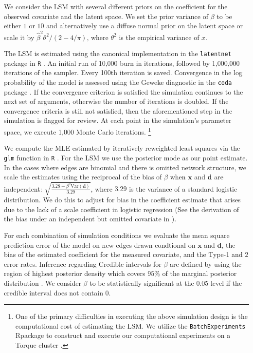 \documentclass[11pt]{article}
\newcommand{\R}{\textsf{R}\space} %
\begin{document}
We consider the LSM with several different priors on the coefficient for the observed covariate and the latent space. We set the prior variance of $\beta$ to be either $1$ or $10$ and alternatively use a diffuse normal prior on the latent space or scale it by $\hat{\beta}^2\theta^2/(2-4/\pi)$, where $\theta^2$ is the empirical variance of $x$.

The LSM is estimated using the canonical implementation in the \texttt{latentnet} package in \texttt{R} \citep{latentnet}. An initial run of 10,000 burn in iterations, followed by 1,000,000 iterations of the sampler. Every 100th iteration is saved. Convergence in the log probability of the model is assessed using the Geweke diagnostic in the \texttt{coda} package \citep{coda, geweke1991evaluating}. If the convergence criterion is satisfied the simulation continues to the next set of arguments, otherwise the number of iterations is doubled. If the convergence criteria is still not satisfied, then the aforementioned step in the simulation is flagged for review. At each point in the simulation's parameter space, we execute 1,000 Monte Carlo iterations. \footnote{One of the primary difficulties in executing the above simulation design is the computational cost of estimating the LSM. We utilize the \texttt{BatchExperiments} \R package to construct and execute our computational experiments on a Torque cluster \cite{bischl2015batchjobs}.}

We compute the MLE estimated by iteratively reweighted least squares via the \texttt{glm} function in \texttt{R} \citep{rcore}. For the LSM we use the posterior mode as our point estimate. In the cases where edges are binomial and there is omitted network structure, we scale the estimates using the reciprocal of the bias of $\beta$ when $\mathbf{x}$ and $\mathbf{d}$ are independent: $\sqrt{\frac{3.28 + \beta^2 \text{Var}(\mathbf{d})}{3.29}}$, where $3.29$ is the variance of a standard logistic distribution. We do this to adjust for bias in the coefficient estimate that arises due to the lack of a scale coefficient in logistic regression (See the derivation of the bias under an independent but omitted covariate in \cite{mood2010logistic}).

For each combination of simulation conditions we evaluate the mean square prediction error of the model on new edges drawn condtional on $\mathbf{x}$ and $\mathbf{d}$, the bias of the estimated coefficient for the measured covariate, and the Type-1 and 2 error rates. Inference regarding Credible intervals for $\beta$ are defined by using the region of highest posterior density which covers $95\%$ of the marginal posterior distribution \cite{turkkan1993computation}. We consider $\beta$ to be statistically significant at the 0.05 level if the credible interval does not contain 0.
\end{document}
